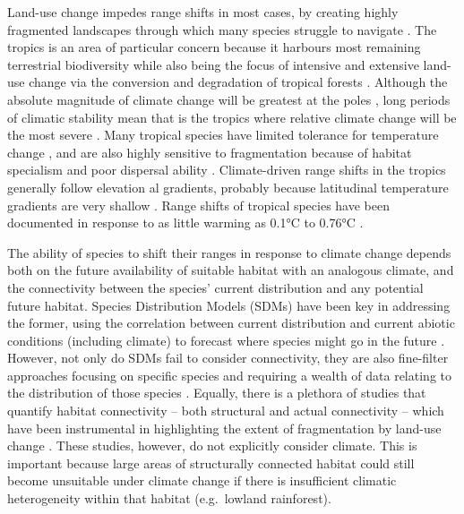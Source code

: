 \documentclass[12pt,a4paper,]{report}
\theoremstyle{definition}
\theoremstyle{definition}
\theoremstyle{definition}
\theoremstyle{remark}
\begin{document}
Land-use change impedes range shifts in most cases, by creating highly
fragmented landscapes through which many species struggle to navigate
\citep{thomas_extinction_2004, heller_biodiversity_2009, tucker_moving_2018}.
The tropics is an area of particular concern because it harbours most
remaining terrestrial biodiversity \citep{jenkins_global_2013} while
also being the focus of intensive and extensive land-use change via the
conversion and degradation of tropical forests
\citep{hansen_high-resolution_2013, lewis_increasing_2015}. Although the
absolute magnitude of climate change will be greatest at the poles
\citep{ipcc_climate_2013}, long periods of climatic stability mean that
is the tropics where relative climate change will be the most severe
\citep{mora_projected_2013}. Many tropical species have limited
tolerance for temperature change
\citep{deutsch_impacts_2008, tewksbury_putting_2008, khaliq_global_2014},
and are also highly sensitive to fragmentation because of habitat
specialism and poor dispersal ability \citep{opdam_climate_2004}.
Climate-driven range shifts in the tropics generally follow elevation al
gradients, probably because latitudinal temperature gradients are very
shallow \citep{loarie_velocity_2009}. Range shifts of tropical species
have been documented in response to as little warming as 0.1°C to 0.76°C
\citep{parmesan_globally_2003, raxworthy_extinction_2008, chen_elevation_2009, peh_potential_2007, freeman_rapid_2014, raxworthy_extinction_2008}.

The ability of species to shift their ranges in response to climate
change depends both on the future availability of suitable habitat with
an analogous climate, and the connectivity between the species' current
distribution and any potential future habitat. Species Distribution
Models (SDMs) have been key in addressing the former, using the
correlation between current distribution and current abiotic conditions
(including climate) to forecast where species might go in the future
\citep{hijmans_ability_2006}. However, not only do SDMs fail to consider
connectivity, they are also fine-filter approaches focusing on specific
species and requiring a wealth of data relating to the distribution of
those species \citep{nunez_connectivity_2013}. Equally, there is a
plethora of studies that quantify habitat connectivity -- both
structural and actual connectivity
\citep{calabrese_comparison-shoppers_2004} -- which have been
instrumental in highlighting the extent of fragmentation by land-use
change
\citep[e.g.][]{tucker_moving_2018, brodie_evaluating_2015, cosgrove_consequences_2017}.
These studies, however, do not explicitly consider climate. This is
important because large areas of structurally connected habitat could
still become unsuitable under climate change if there is insufficient
climatic heterogeneity within that habitat (e.g.~lowland rainforest).
\end{document}
